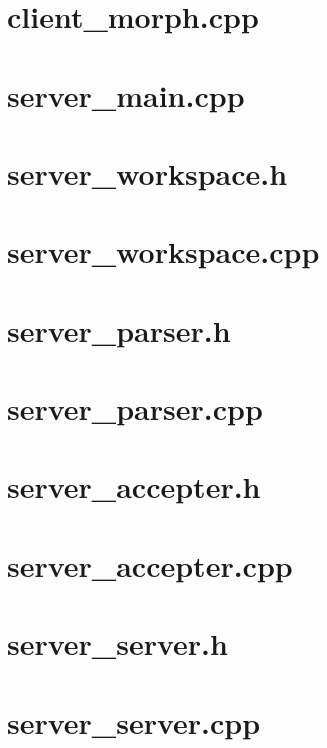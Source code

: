 \documentclass{article}
\begin{document}
\section{ client\_morph.cpp }


\newpage
\section{ server\_main.cpp }

\newpage
\section{ server\_workspace.h }

\newpage
\section{ server\_workspace.cpp }

\newpage
\section{ server\_parser.h }

\newpage
\section{ server\_parser.cpp }

\newpage
\section{ server\_accepter.h }

\newpage
\section{ server\_accepter.cpp }

\newpage
\section{ server\_server.h }

\newpage
\section{ server\_server.cpp }

\newpage
\end{document}
